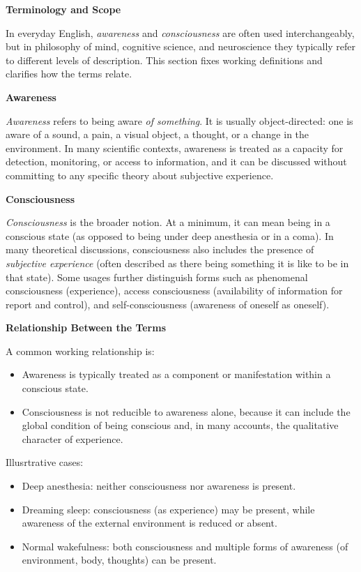 \documentclass{book}
\providecommand{\ProjectDeepHeading}[2]{%
    \par\medskip\noindent\textbf{#2}\par\smallskip
}
\begin{document}

\ProjectDeepHeading{5}{Terminology and Scope}
        
        In everyday English, \emph{awareness} and \emph{consciousness} are often used interchangeably, but in philosophy of mind, cognitive science, and neuroscience they typically refer to different levels of description. This section fixes working definitions and clarifies how the terms relate.
    
    
    \ProjectDeepHeading{5}{Awareness}
        
        \emph{Awareness} refers to being aware \emph{of something}. It is usually object-directed: one is aware of a sound, a pain, a visual object, a thought, or a change in the environment. In many scientific contexts, awareness is treated as a capacity for detection, monitoring, or access to information, and it can be discussed without committing to any specific theory about subjective experience.
    
    
    \ProjectDeepHeading{5}{Consciousness}
        
        \emph{Consciousness} is the broader notion. At a minimum, it can mean being in a conscious state (as opposed to being under deep anesthesia or in a coma). In many theoretical discussions, consciousness also includes the presence of \emph{subjective experience} (often described as there being something it is like to be in that state). Some usages further distinguish forms such as phenomenal consciousness (experience), access consciousness (availability of information for report and control), and self-consciousness (awareness of oneself as oneself).
    
    
    \ProjectDeepHeading{5}{Relationship Between the Terms}
        
        A common working relationship is:
        \begin{itemize}
            \item Awareness is typically treated as a component or manifestation within a conscious state.
            \item Consciousness is not reducible to awareness alone, because it can include the global condition of being conscious and, in many accounts, the qualitative character of experience.
        \end{itemize}
        
        Illusrtrative cases:
        \begin{itemize}
            \item Deep anesthesia: neither consciousness nor awareness is present.
            \item Dreaming sleep: consciousness (as experience) may be present, while awareness of the external environment is reduced or absent.
            \item Normal wakefulness: both consciousness and multiple forms of awareness (of environment, body, thoughts) can be present.
        \end{itemize}
    
\end{document}
